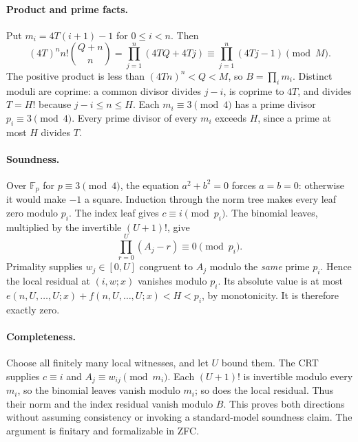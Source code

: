 \paragraph{Product and prime facts.}
Put $m_i=4T(i+1)-1$ for $0\leq i<n$. Then
\[
 (4T)^n n!\binom{Q+n}{n}
 =\prod_{j=1}^n(4TQ+4Tj)
 \equiv\prod_{j=1}^n(4Tj-1)\pmod M.
\]
The positive product is less than $(4Tn)^n<Q<M$, so
$B=\prod_i m_i$. Distinct moduli are coprime: a common divisor divides
$j-i$, is coprime to $4T$, and divides $T=H!$ because $j-i\leq n\leq H$.
Each $m_i\equiv3\pmod4$ has a prime divisor $p_i\equiv3\pmod4$.
Every prime divisor of every $m_i$ exceeds $H$, since a prime at most $H$
divides $T$.

\paragraph{Soundness.}
Over $\mathbb F_p$ for $p\equiv3\pmod4$, the equation $a^2+b^2=0$
forces $a=b=0$: otherwise it would make $-1$ a square.
Induction through the norm tree makes every leaf zero modulo $p_i$.
The index leaf gives $c\equiv i\pmod{p_i}$.
The binomial leaves, multiplied by the invertible $(U+1)!$, give
\[
 \prod_{r=0}^{U}(A_j-r)\equiv0\pmod{p_i}.
\]
Primality supplies $w_j\in[0,U]$ congruent to $A_j$ modulo the
\emph{same} prime $p_i$. Hence the local residual at $(i,w;x)$ vanishes
modulo $p_i$. Its absolute value is at most
$e(n,U,\ldots,U;x)+f(n,U,\ldots,U;x)<H<p_i$, by monotonicity.
It is therefore exactly zero.

\paragraph{Completeness.}
Choose all finitely many local witnesses, and let $U$ bound them.
The CRT supplies $c\equiv i$ and $A_j\equiv w_{ij}\pmod{m_i}$.
Each $(U+1)!$ is invertible modulo every $m_i$, so the binomial leaves
vanish modulo $m_i$; so does the local residual. Thus their norm and
the index residual vanish modulo $B$. This proves both directions
without assuming consistency or invoking a standard-model soundness claim.
The argument is finitary and formalizable in ZFC.

